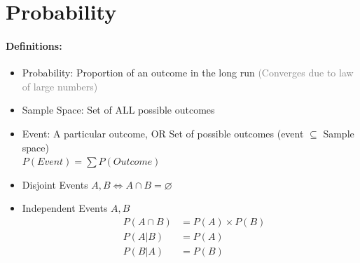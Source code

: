 \section{Probability}
\paragraph{Definitions:}
\begin{itemize}
	\item Probability: Proportion of an outcome in the long run \textcolor{Gray}{(Converges due to law of large numbers)}
	\item Sample Space: Set of ALL possible outcomes
	\item Event: A particular outcome, OR Set of possible outcomes (event $\subseteq$ Sample space)\\
		$P(Event)=\sum P(Outcome)$
	\item Disjoint Events $A,B\iff A\cap B = \varnothing$
	\item Independent Events $A,B$
		\begin{align*}
			&P(A\cap B)&=P(A)\times P(B)\\
			&P(A|B)&=P(A)\\
			&P(B|A)&=P(B)
		\end{align*}

\end{itemize}
